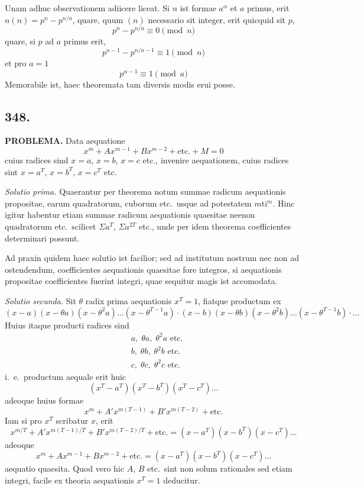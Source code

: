 \documentclass[12pt,a4paper]{article}
\begin{document}
Unam adhuc observationem adiicere liceat. Si $n$ ist formae $a^\alpha$ et $a$ primus, erit $n(n) = p^n - p^{n/a}$, quare, quum $(n)$ necessario sit integer, erit quicquid sit $p$,
\[
p^n - p^{n/a} \equiv 0 \pmod{n}
\]
quare, si $p$ ad $a$ primus erit,
\[
p^{n-1} - p^{n/a-1} \equiv 1 \pmod{n}
\]
et pro $a=1$
\[
p^{\alpha-1} \equiv 1 \pmod{a}
\]
Memorabile ist, haec theoremata tam diversis modis erui posse.

\subsection*{348.}

\textbf{PROBLEMA.} Data aequatione
\[
x^m + Ax^{m-1} + Bx^{m-2} + \text{etc.} + M = 0
\]
cuius radices sind $x=a$, $x=b$, $x=c$ etc., invenire aequationem, cuius radices sint $x=a^T$, $x=b^T$, $x=c^T$ etc.

\textit{Solutio prima.} Quaerantur per theorema notum summae radicum aequationis propositae, earum quadratorum, cuborum etc.~usque ad potestatem $m$ti$^m$. Hinc igitur habentur etiam summae radicum aequationis quaesitae neenon quadratorum etc.~scilicet $\Sigma a^T$, $\Sigma a^{2T}$ etc., unde per idem theorema coefficientes determinari possunt.

Ad praxin quidem haec solutio ist facilior; sed ad institutum nostrum nec non ad ostendendum, coefficientes aequationis quaesitae fore integros, si aequationis propositae coefficientes fuerint integri, quae sequitur magis ist accomodata.

\textit{Solutio secunda.} Sit $\theta$ radix prima aequationis $x^T=1$, fiatque productum ex
\[
(x-a)(x-\theta a)(x-\theta^2 a)\ldots(x-\theta^{T-1}a) \cdot (x-b)(x-\theta b)(x-\theta^2 b)\ldots(x-\theta^{T-1}b) \cdot \ldots
\]
Huius itaque producti radices sind
\[
\begin{aligned}
& a,\; \theta a,\; \theta^2 a \text{ etc.}\\
& b,\; \theta b,\; \theta^2 b \text{ etc.}\\
& c,\; \theta c,\; \theta^2 c \text{ etc.}
\end{aligned}
\]
i.~e.~productum aequale erit huic
\[
(x^T-a^T)(x^T-b^T)(x^T-c^T)\ldots
\]
adeoque huius formae
\[
x^m + A'x^{m(T-1)} + B'x^{m(T-2)} + \text{etc.}
\]
Iam si pro $x^T$ scribatur $x$, erit
\[
x^{m/T} + A'x^{m(T-1)/T} + B'x^{m(T-2)/T} + \text{etc.} = (x-a^T)(x-b^T)(x-c^T)\ldots
\]
adeoque
\[
x^m + Ax^{m-1} + Bx^{m-2} + \text{etc.} = (x-a^T)(x-b^T)(x-c^T)\ldots
\]
aequatio quaesita. Quod vero hic $A$, $B$ etc.~sint non solum rationales sed etiam integri, facile ex theoria aequationis $x^T=1$ deducitur.
\end{document}
